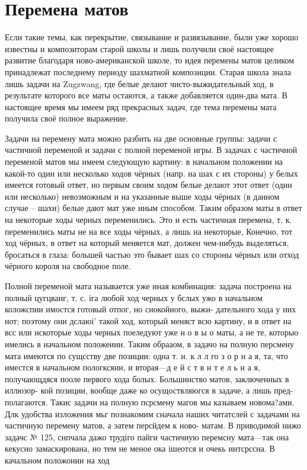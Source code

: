 \chapter{Перемена матов}

Если такие темы, как перекрытие, связывание и развязывание, были уже хорошо известны и композиторам старой школы и лишь получили своё настоящее развитие благодаря ново-американской школе, то идея перемены матов целиком принадлежат последнему периоду шахматной композиции. Старая школа знала лишь задачи на Zugzwang, где белые делают чисто-выжидательный ход, в результате которого все маты остаются, а также добавляется один-два мата. В настоящее время мы имеем ряд прекрасных задач, где тема перемены мата получила своё полное выражение.

Задачи на перемену мата можно разбить на две основные группы: задачи с частичной переменой и задачи с полной переменой игры. В задачах с частичной переменой матов мы имеем следующую картину: в начальном положении на какой-то один или несколько ходов чёрных (напр. на шах с их стороны) у белых имеется готовый ответ, но первым своим ходом белые делают этот ответ (один или несколько) невозможным и на указанные выше ходы чёрных (в данном случае -- шахи) белые дают мат уже иным способом. Таким образом маты в ответ на некоторые ходы черных переменились. Это и есть частичная перемена, т, к. переменились маты не на все ходы чёрных, а лишь на некоторые, Конечно, тот ход чёрных, в ответ на который меняется мат, должен чем-нибудь выделяться, бросаться в глаза: большей частью это бывает шах со стороны чёрных или отход чёрного короля на свободное поле.

Полной переменой мата называется уже иная комбинация: задача построена на полный цугцванг, т. с. іга любой ход черных у бслых ужо в начальном коложспии имостся готовый отпог, но сиокойиого, выжи- дательного хода у них нот; поэтому они дслаюі' такой ход, который меняст всю картину, и в ответ на всс или нскоторые ходы черных поеледуют уже н о в ы о маты, а не те, которыо имелись в начальном положеиии. Таким обрааом, в задачо на полную персмену мата имеются по сущсству две позиции: одна т. н. к л л го з о р н а я, та, что иместся в начальном пологксяии, и вторая—д е й с т в н т е л ь н а я, получающдяся пооле первого хода болых. Большинство матов, заключенных в иллюзор- кой позиции, вообще даже ко осущоствляюгся в задаче, а лишь пред- полагаются. Такис задачи на полную псрсмену магов мы казываем новома?ами.
    Длк удобства изложения мьг познакомим сначала наших читатслей с задачами на частичную перемену матов, а эатем персйдем к ново- матам.
    В приводимой нижо задачс № 125, снпчала дажо трудіго пайги частичиую перемсну мата—так она кекусно замаскирована, но тем не меное ока ішеотся и очекь интсрссна. В качальном положонии на ход

